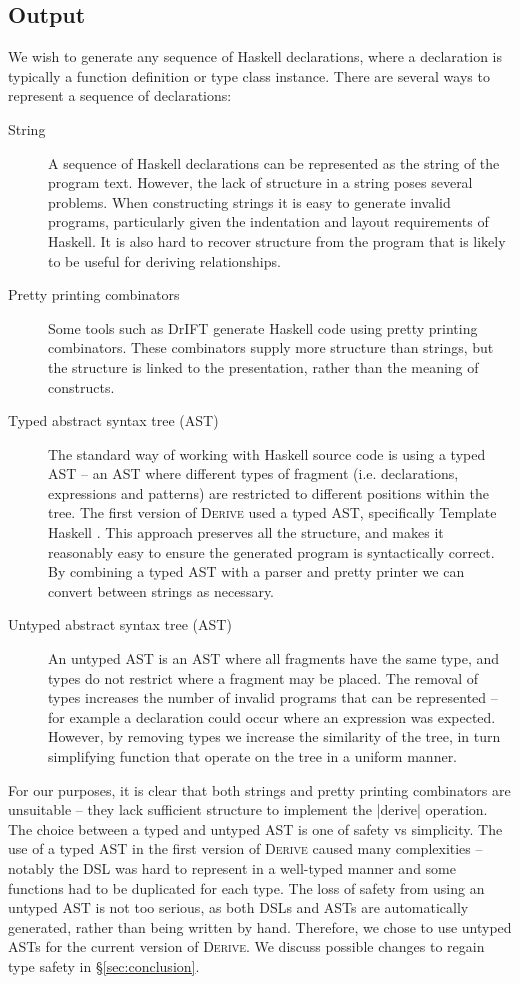 \documentclass[preprint,draft]{sigplanconf}
\newcommand{\derive}{\textsc{Derive}}
\begin{document}
\subsection{Output}
\label{sec:output}

We wish to generate any sequence of Haskell declarations, where a declaration is typically a function definition or type class instance. There are several ways to represent a sequence of declarations:

\begin{description}
\item[String] A sequence of Haskell declarations can be represented as the string of the program text. However, the lack of structure in a string poses several problems. When constructing strings it is easy to generate invalid programs, particularly given the indentation and layout requirements of Haskell. It is also hard to recover structure from the program that is likely to be useful for deriving relationships.
\item[Pretty printing combinators] Some tools such as DrIFT \cite{drift} generate Haskell code using pretty printing combinators. These combinators supply more structure than strings, but the structure is linked to the presentation, rather than the meaning of constructs.
\item[Typed abstract syntax tree (AST)] The standard way of working with Haskell source code is using a typed AST -- an AST where different types of fragment (i.e. declarations, expressions and patterns) are restricted to different positions within the tree. The first version of \derive{} used a typed AST, specifically Template Haskell \cite{template_haskell}. This approach preserves all the structure, and makes it reasonably easy to ensure the generated program is syntactically correct. By combining a typed AST with a parser and pretty printer we can convert between strings as necessary.
\item[Untyped abstract syntax tree (AST)] An untyped AST is an AST where all fragments have the same type, and types do not restrict where a fragment may be placed. The removal of types increases the number of invalid programs that can be represented -- for example a declaration could occur where an expression was expected. However, by removing types we increase the similarity of the tree, in turn simplifying function that operate on the tree in a uniform manner.
\end{description}

For our purposes, it is clear that both strings and pretty printing combinators are unsuitable -- they lack sufficient structure to implement the |derive| operation. The choice between a typed and untyped AST is one of safety vs simplicity. The use of a typed AST in the first version of \derive{} caused many complexities -- notably the DSL was hard to represent in a well-typed manner and some functions had to be duplicated for each type. The loss of safety from using an untyped AST is not too serious, as both DSLs and ASTs are automatically generated, rather than being written by hand. Therefore, we chose to use untyped ASTs for the current version of \derive{}. We discuss possible changes to regain type safety in \S\ref{sec:conclusion}.
\end{document}
